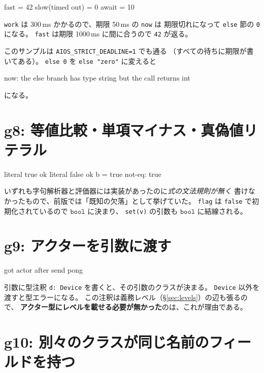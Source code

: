 \documentclass[11pt,a4paper]{ltjsarticle}
\newcommand{\ty}[1]{\ensuremath{\mathtt{#1}}}
\begin{document}


\begin{term}
fast = 42
slow(timed out) = 0
await = 10
\end{term}

\texttt{work} は 300\,ms かかるので、期限 50\,ms の \texttt{now} は
期限切れになって \texttt{else} 節の \texttt{0} になる。
\texttt{fast} は期限 1000\,ms に間に合うので \texttt{42} が返る。

このサンプルは \texttt{AIOS\_STRICT\_DEADLINE=1} でも通る
（すべての待ちに期限が書いてある）。
\texttt{else 0} を \texttt{else "zero"} に変えると

\begin{term}
 now: the else branch has type string but the call returns int
\end{term}

になる。

\section{g8: 等値比較・単項マイナス・真偽値リテラル}



\begin{term}
literal true ok
literal false ok
b = true
not-eq: true
\end{term}

いずれも字句解析器と評価器には実装があったのに\emph{式の文法規則が無く}
書けなかったもので、前版では「既知の欠落」として挙げていた。
\texttt{flag} は \texttt{false} で初期化されているので \ty{bool} に決まり、
\texttt{set(v)} の引数も \ty{bool} に結線される。

\section{g9: アクターを引数に渡す}



\begin{term}
got actor
after send
pong
\end{term}

引数に型注釈 \texttt{d: Device} を書くと、その引数のクラスが決まる。
\texttt{Device} 以外を渡すと型エラーになる。
この注釈は義務レベル（\S\ref{sec:levels}）の辺も張るので、
\textbf{アクター型にレベルを載せる必要が無かった}のは、これが理由である。

\section{g10: 別々のクラスが同じ名前のフィールドを持つ}
\end{document}
